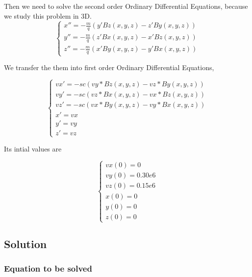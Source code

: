 \documentclass[12pt]{article}
\begin{document}
Then we need to solve the second order Ordinary Diﬀerential Equations, because we study this problem in 3D.
\begin{equation}
    \begin{cases}
        x''=-\frac{m}{q}(y'Bz(x,y,z)-z'By(x,y,z))\\
        y''=-\frac{m}{q}(z'Bx(x,y,z)-x'Bz(x,y,z))\\
        z''=-\frac{m}{q}(x'By(x,y,z)-y'Bx(x,y,z))
    \end{cases}
\end{equation}

We transfer the them into first order Ordinary Diﬀerential Equations,

\begin{equation}
    \begin{cases}
        vx'=-sc(vy*Bz(x,y,z)-vz*By(x,y,z))\\
        vy'=-sc(vz*Bx(x,y,z)-vx*Bz(x,y,z))\\
        vz'=-sc(vx*By(x,y,z)-vy*Bx(x,y,z))\\
        x'=vx\\
        y'=vy\\
        z'=vz
    \end{cases}
\end{equation}

Its intial values are

\begin{equation}
    \begin{cases}
        vx(0)=0\\
        vy(0)=0.30e6\\
        vz(0)=0.15e6\\
        x(0)=0\\
        y(0)=0\\
        z(0)=0
    \end{cases}
\end{equation}
\subsection{Solution}
\subsubsection{Equation to be solved}

\indent


\end{document}
